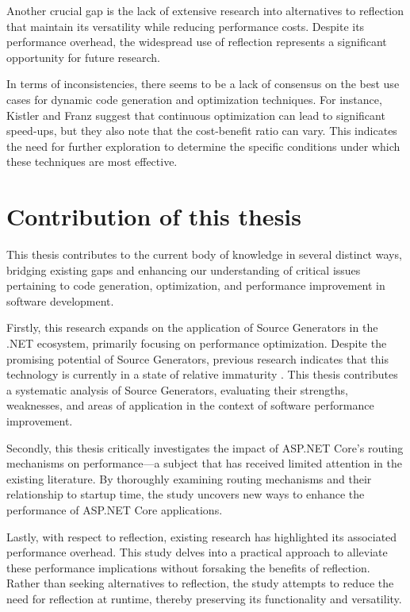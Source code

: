 Another crucial gap is the lack of extensive research into alternatives to reflection that maintain its versatility while reducing performance costs. Despite its performance overhead, the widespread use of reflection represents a significant opportunity for future research.

In terms of inconsistencies, there seems to be a lack of consensus on the best use cases for dynamic code generation and optimization techniques. For instance, Kistler and Franz \cite{Kistler2003} suggest that continuous optimization can lead to significant speed-ups, but they also note that the cost-benefit ratio can vary. This indicates the need for further exploration to determine the specific conditions under which these techniques are most effective.

\section{Contribution of this thesis}

This thesis contributes to the current body of knowledge in several distinct ways, bridging existing gaps and enhancing our understanding of critical issues pertaining to code generation, optimization, and performance improvement in software development.

Firstly, this research expands on the application of Source Generators in the .NET ecosystem, primarily focusing on performance optimization. Despite the promising potential of Source Generators, previous research indicates that this technology is currently in a state of relative immaturity \cite{Slimak2022}. This thesis contributes a systematic analysis of Source Generators, evaluating their strengths, weaknesses, and areas of application in the context of software performance improvement.

Secondly, this thesis critically investigates the impact of ASP.NET Core's routing mechanisms on performance—a subject that has received limited attention in the existing literature. By thoroughly examining routing mechanisms and their relationship to startup time, the study uncovers new ways to enhance the performance of ASP.NET Core applications.

Lastly, with respect to reflection, existing research has highlighted its associated performance overhead. This study delves into a practical approach to alleviate these performance implications without forsaking the benefits of reflection. Rather than seeking alternatives to reflection, the study attempts to reduce the need for reflection at runtime, thereby preserving its functionality and versatility.
